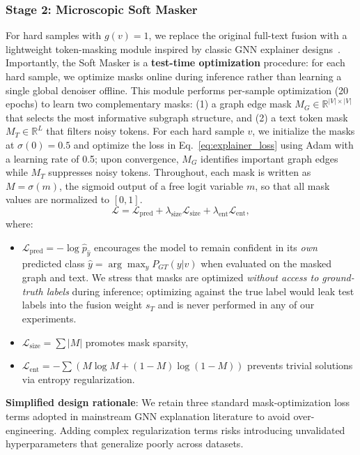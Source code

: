 \documentclass[preprint,12pt,authoryear]{elsarticle}
\begin{document}
\subsubsection{Stage 2: Microscopic Soft Masker}
For hard samples with $g(v)=1$, we replace the original full-text fusion with a lightweight token-masking module inspired by classic GNN explainer designs~\citep{ying2019gnnexplainer}. Importantly, the Soft Masker is a \textbf{test-time optimization} procedure: for each hard sample, we optimize masks online during inference rather than learning a single global denoiser offline. This module performs per-sample optimization (20 epochs) to learn two complementary masks: (1) a graph edge mask $M_G \in \mathbb{R}^{|V| \times |V|}$ that selects the most informative subgraph structure, and (2) a text token mask $M_T \in \mathbb{R}^{L}$ that filters noisy tokens. For each hard sample $v$, we initialize the masks at $\sigma(0)=0.5$ and optimize the loss in Eq.~\eqref{eq:explainer_loss} using Adam with a learning rate of 0.5; upon convergence, $M_G$ identifies important graph edges while $M_T$ suppresses noisy tokens. Throughout, each mask is written as $M=\sigma(m)$, the sigmoid output of a free logit variable $m$, so that all mask values are normalized to $[0,1]$.
\begin{equation}
\mathcal{L} = \mathcal{L}_{\text{pred}} + \lambda_{\text{size}}\mathcal{L}_{\text{size}} + \lambda_{\text{ent}}\mathcal{L}_{\text{ent}},
\label{eq:explainer_loss}
\end{equation}
where:
\begin{itemize}
    \item $\mathcal{L}_{\text{pred}} = -\log \hat{p}_{\hat y}$ encourages the model to remain confident in its \emph{own} predicted class $\hat y=\arg\max_y P_{GT}(y|v)$ when evaluated on the masked graph and text. We stress that masks are optimized \emph{without access to ground-truth labels} during inference; optimizing against the true label would leak test labels into the fusion weight $s_T$ and is never performed in any of our experiments.
    \item $\mathcal{L}_{\text{size}} = \sum |M|$ promotes mask sparsity,
    \item $\mathcal{L}_{\text{ent}} = -\sum (M \log M + (1-M)\log(1-M))$ prevents trivial solutions via entropy regularization.
\end{itemize}
\textbf{Simplified design rationale}: We retain three standard mask-optimization loss terms adopted in mainstream GNN explanation literature to avoid over-engineering. Adding complex regularization terms risks introducing unvalidated hyperparameters that generalize poorly across datasets.
\end{document}
